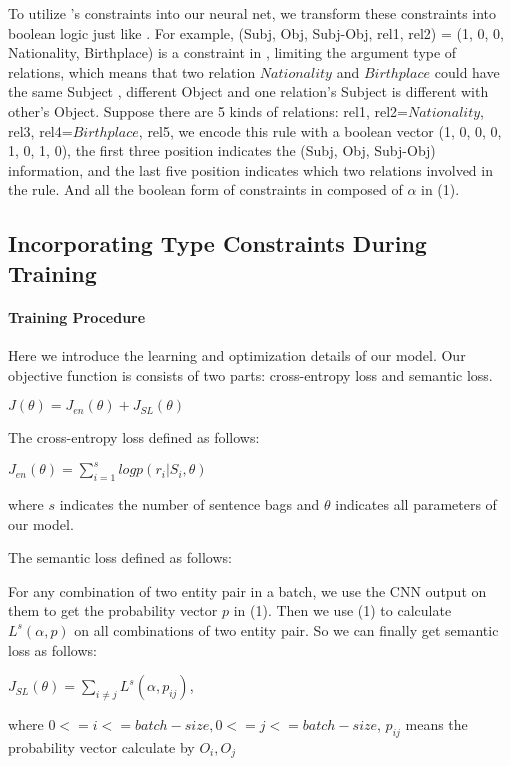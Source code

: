 To utilize \cite{chen2014encoding}'s constraints into our neural net, we transform these constraints into boolean logic just like \cite{xu2017semantic}. For example, (Subj, Obj, Subj-Obj, rel1, rel2) = (1, 0, 0, Nationality, Birthplace) is a constraint in \cite{chen2014encoding}, limiting the argument type of relations, which means that two relation $ Nationality $ and $ Birthplace $ could have the same Subject , different Object and one relation's Subject is different with other's Object. Suppose there are 5 kinds of relations: rel1, rel2=$ Nationality $, rel3, rel4=$ Birthplace $, rel5, we encode this rule with a boolean vector (1, 0, 0, 0, 1, 0, 1, 0), the first three position indicates the (Subj, Obj, Subj-Obj) information, and the last five position indicates which two relations involved in the rule. And all the boolean form of constraints in \cite{chen2014encoding} composed of  $ \alpha $ in (1).

\subsection{Incorporating  Type Constraints During Training}
\label{sec:loss_term}
\paragraph{Training Procedure}
Here we introduce the learning and optimization details of our model. Our objective function is consists of two parts: cross-entropy loss and semantic loss.
\begin{center}
	$ J(\theta) = J_{en}(\theta) + J_{SL}(\theta)$
\end{center}

The cross-entropy loss defined as follows:
\begin{center}
	$ J_{en}(\theta)= \sum\limits_{i=1}^{s}logp(r_i|S_i, \theta)$	
\end{center}
where $ s $ indicates the number of sentence bags and $ \theta $ indicates all parameters of our model.

The semantic loss defined as follows:

For any combination of two entity pair in a batch, we use the CNN output on them to get the probability vector $ p $ in (1). Then we use (1) to calculate $L^{s}(\alpha, p)$ on all combinations of two entity pair. So we can finally get semantic loss as follows:
\begin{center}
	$ J_{SL}(\theta) = \sum\limits_{i \neq j}L^{s}(\alpha, p_{ij}) $,
\end{center}
where $0<=i<=batch-size, 0<=j<=batch-size$, $ p_{ij} $ means the probability vector calculate by $ O_i, O_j $

